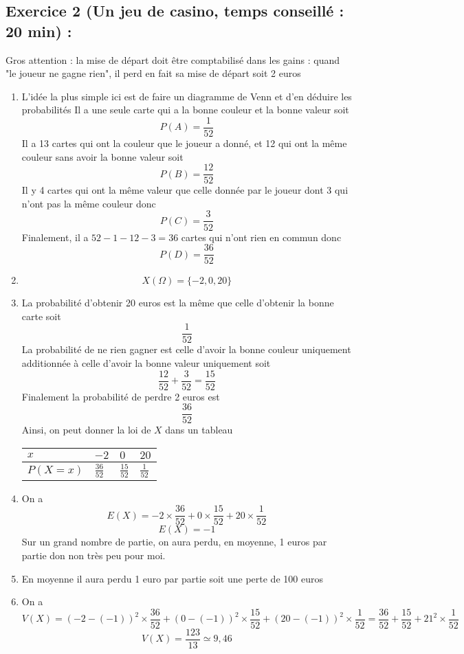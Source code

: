 \subsection*{Exercice 2 (Un jeu de casino, temps conseillé : 20 min) : }
Gros attention : la mise de départ doit être comptabilisé dans les gains : quand "le joueur ne gagne rien", il perd en fait sa mise de départ soit 2 euros
\begin{enumerate}
\item L'idée la plus simple ici est de faire un diagramme de Venn et d'en déduire les probabilités\newline
Il a une seule carte qui a la bonne couleur et la bonne valeur soit 
$$\boxed{P(A) = \frac{1}{52}}$$
Il a 13 cartes qui ont la couleur que le joueur a donné, et 12 qui ont la même couleur sans avoir la bonne valeur soit 
$$\boxed{P(B) = \frac{12}{52}}$$
Il y 4 cartes qui ont la même valeur que celle donnée par le joueur dont 3 qui n'ont pas la même couleur donc 
$$\boxed{P(C) = \frac{3}{52}}$$
Finalement, il a $52-1-12-3 = 36$ cartes qui n'ont rien en commun donc 
$$\boxed{P(D) = \frac{36}{52}}$$
\item $$\boxed{X(\Omega) =\{-2,0,20\}}$$
\item La probabilité d'obtenir 20 euros est la même que celle d'obtenir la bonne carte soit $$\frac{1}{52}$$ La probabilité de ne rien gagner est celle d'avoir la bonne couleur uniquement additionnée à celle d'avoir la bonne valeur uniquement soit 
$$\frac{12}{52} + \frac{3}{52} = \frac{15}{52}$$
Finalement la probabilité de perdre 2 euros est $$\frac{36}{52}$$ Ainsi, on peut donner la loi de $X$ dans un tableau \newline
\begin{tabularx}{\linewidth}{|X|X|X|X|}
\hline
$x$ & $-2$ & $0$ & $20$\\ \hline
$P(X=x)$ & $ \frac{36}{52}$ & $ \frac{15}{52}$ & $ \frac{1}{52}$ \rule[-7pt]{0pt}{20pt} \\ \hline
\end{tabularx}
\item On a $$E(X) = -2 \times \frac{36}{52} + 0 \times \frac{15}{52} + 20 \times \frac{1}{52}$$ $$\boxed{E(X) = -1}$$ Sur un grand nombre de partie, on aura perdu, en moyenne, 1 euros par partie don non très peu pour moi.
\item En moyenne il aura perdu 1 euro par partie soit une perte de 100 euros
\item On a $$V(X) = (-2-(-1))^2\times \frac{36}{52} + (0 -(-1))^2 \times \frac{15}{52} + (20 -(-1))^2 \times \frac{1}{52} = \frac{36}{52} + \frac{15}{52} + 21^2 \times \frac{1}{52}$$
$$\boxed{V(X) = \frac{123}{13} \simeq 9,46}$$


\end{enumerate}
